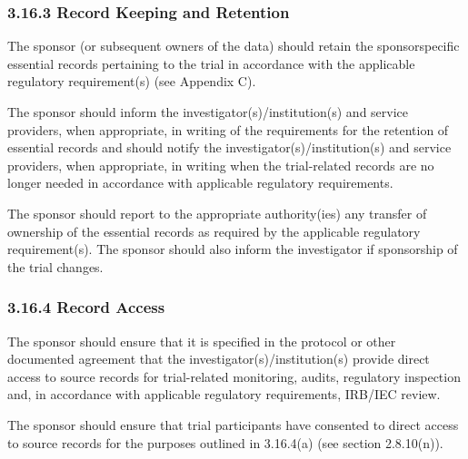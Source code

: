 \documentclass[11pt]{article}
\begin{document}
\subsubsection{3.16.3 Record Keeping and Retention}

\begin{description}[leftmargin=2.5cm,style=sameline]

\item[(a)] The sponsor (or subsequent owners of the data) should retain the sponsorspecific essential records pertaining to the trial in accordance with the applicable regulatory requirement(s) (see Appendix C).

\item[(b)] The sponsor should inform the investigator(s)/institution(s) and service providers, when appropriate, in writing of the requirements for the retention of essential records and should notify the investigator(s)/institution(s) and service providers, when appropriate, in writing when the trial-related records are no longer needed in accordance with applicable regulatory requirements.

\item[(c)] The sponsor should report to the appropriate authority(ies) any transfer of ownership of the essential records as required by the applicable regulatory requirement(s). The sponsor should also inform the investigator if sponsorship of the trial changes.

\end{description}

\subsubsection{3.16.4 Record Access}

\begin{description}[leftmargin=2.5cm,style=sameline]

\item[(a)] The sponsor should ensure that it is specified in the protocol or other documented agreement that the investigator(s)/institution(s) provide direct access to source records for trial-related monitoring, audits, regulatory inspection and, in accordance with applicable regulatory requirements, IRB/IEC review.

\item[(b)] The sponsor should ensure that trial participants have consented to direct access to source records for the purposes outlined in 3.16.4(a) (see section 2.8.10(n)).

\end{description}
\end{document}
